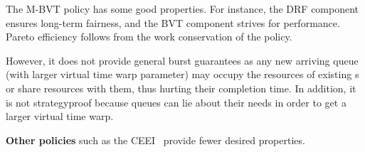 
The M-BVT policy has some good properties. For instance, the DRF component ensures long-term fairness, and the BVT component strives for performance. Pareto efficiency follows from the work conservation of the policy. 

However, it does not provide general burst guarantees as any new arriving queue (with larger virtual time warp parameter) may occupy the resources of existing {\burstq}s or share resources with them, thus hurting their completion time. In addition, it is not strategyproof because queues can lie about their needs in order to get a larger virtual time warp. 







\textbf{Other policies} such as the CEEI~\cite{moulin2014cooperative} provide fewer desired properties. 

